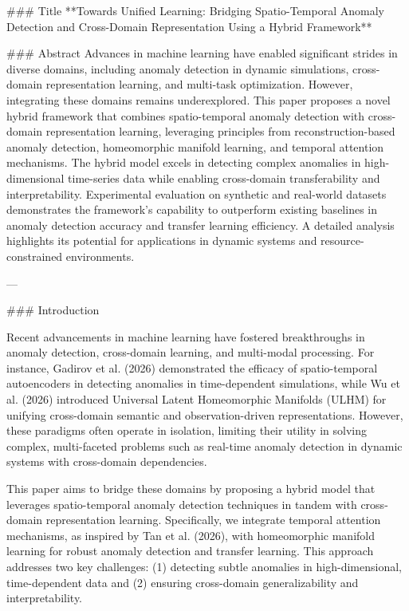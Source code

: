### Title  
**Towards Unified Learning: Bridging Spatio-Temporal Anomaly Detection and Cross-Domain Representation Using a Hybrid Framework**

### Abstract  
Advances in machine learning have enabled significant strides in diverse domains, including anomaly detection in dynamic simulations, cross-domain representation learning, and multi-task optimization. However, integrating these domains remains underexplored. This paper proposes a novel hybrid framework that combines spatio-temporal anomaly detection with cross-domain representation learning, leveraging principles from reconstruction-based anomaly detection, homeomorphic manifold learning, and temporal attention mechanisms. The hybrid model excels in detecting complex anomalies in high-dimensional time-series data while enabling cross-domain transferability and interpretability. Experimental evaluation on synthetic and real-world datasets demonstrates the framework's capability to outperform existing baselines in anomaly detection accuracy and transfer learning efficiency. A detailed analysis highlights its potential for applications in dynamic systems and resource-constrained environments.

---

### Introduction  

Recent advancements in machine learning have fostered breakthroughs in anomaly detection, cross-domain learning, and multi-modal processing. For instance, Gadirov et al. (2026) demonstrated the efficacy of spatio-temporal autoencoders in detecting anomalies in time-dependent simulations, while Wu et al. (2026) introduced Universal Latent Homeomorphic Manifolds (ULHM) for unifying cross-domain semantic and observation-driven representations. However, these paradigms often operate in isolation, limiting their utility in solving complex, multi-faceted problems such as real-time anomaly detection in dynamic systems with cross-domain dependencies.  

This paper aims to bridge these domains by proposing a hybrid model that leverages spatio-temporal anomaly detection techniques in tandem with cross-domain representation learning. Specifically, we integrate temporal attention mechanisms, as inspired by Tan et al. (2026), with homeomorphic manifold learning for robust anomaly detection and transfer learning. This approach addresses two key challenges: (1) detecting subtle anomalies in high-dimensional, time-dependent data and (2) ensuring cross-domain generalizability and interpretability.

